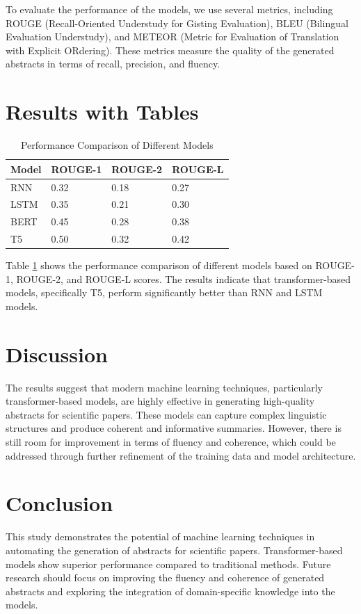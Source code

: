 \documentclass{article}
\begin{document}
To evaluate the performance of the models, we use several metrics, including ROUGE (Recall-Oriented Understudy for Gisting Evaluation), BLEU (Bilingual Evaluation Understudy), and METEOR (Metric for Evaluation of Translation with Explicit ORdering). These metrics measure the quality of the generated abstracts in terms of recall, precision, and fluency.

\section{Results with Tables}
\begin{table}[ht]
\centering
\caption{Performance Comparison of Different Models}
\begin{tabular}{@{}llll@{}}
\toprule
Model & ROUGE-1 & ROUGE-2 & ROUGE-L \\ \midrule
RNN   & 0.32   & 0.18   & 0.27    \\
LSTM  & 0.35   & 0.21   & 0.30    \\
BERT  & 0.45   & 0.28   & 0.38    \\
T5    & 0.50   & 0.32   & 0.42    \\ \bottomrule
\end{tabular}
\label{tab:results}
\end{table}

Table \ref{tab:results} shows the performance comparison of different models based on ROUGE-1, ROUGE-2, and ROUGE-L scores. The results indicate that transformer-based models, specifically T5, perform significantly better than RNN and LSTM models.

\section{Discussion}
The results suggest that modern machine learning techniques, particularly transformer-based models, are highly effective in generating high-quality abstracts for scientific papers. These models can capture complex linguistic structures and produce coherent and informative summaries. However, there is still room for improvement in terms of fluency and coherence, which could be addressed through further refinement of the training data and model architecture.

\section{Conclusion}
This study demonstrates the potential of machine learning techniques in automating the generation of abstracts for scientific papers. Transformer-based models show superior performance compared to traditional methods. Future research should focus on improving the fluency and coherence of generated abstracts and exploring the integration of domain-specific knowledge into the models.
\end{document}
